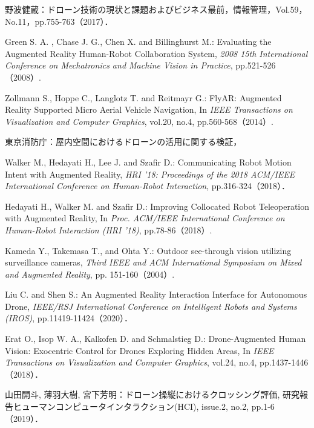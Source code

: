 \documentclass[submit,techrep]{ipsj}
\begin{document}
\begin{thebibliography}{10}

野波健蔵：ドローン技術の現状と課題およびビジネス最前，情報管理，Vol.59，No.11，pp.755-763（2017）．


Green S. A. , Chase J. G., Chen X. and Billinghurst M.: Evaluating the Augmented Reality Human-Robot Collaboration System, 
{\it 2008 15th International Conference on Mechatronics and Machine Vision in Practice}, 
pp.521-526（2008）.

Zollmann S., Hoppe C., Langlotz T. and Reitmayr G.:
FlyAR: Augmented Reality Supported Micro Aerial Vehicle Navigation, In 
{\it IEEE Transactions on Visualization and Computer Graphics}, 
vol.20, no.4, pp.560-568（2014）. 


東京消防庁：屋内空間におけるドローンの活用に関する検証，

Walker M., Hedayati H., Lee J. and Szafir D.: Communicating Robot Motion Intent with Augmented Reality, 
{\it HRI '18: Proceedings of the 2018 ACM/IEEE International Conference on Human-Robot Interaction}, 
pp.316-324（2018）．

Hedayati H., Walker M. and Szafir D.: Improving Collocated Robot Teleoperation with Augmented Reality, In 
{\it Proc. ACM/IEEE International Conference on Human-Robot Interaction (HRI '18)}, 
pp.78-86（2018）.

Kameda Y., Takemasa T., and Ohta Y.: Outdoor see-through vision utilizing surveillance cameras, 
{\it Third IEEE and ACM International Symposium on Mixed and Augmented Reality}, 
pp.
151-160（2004）.

Liu C. and Shen S.: An Augmented Reality Interaction Interface for Autonomous Drone, 
{\it IEEE/RSJ International Conference on Intelligent Robots and Systems (IROS)}, 
pp.11419-11424（2020）．

Erat O., Isop W. A., Kalkofen D. and Schmalstieg D.: Drone-Augmented Human Vision: Exocentric Control for Drones Exploring Hidden Areas, In 
{\it IEEE Transactions on Visualization and Computer Graphics}, 
vol.24, no.4, pp.1437-1446（2018）．

山田開斗, 薄羽大樹, 宮下芳明：ドローン操縦におけるクロッシング評価, 研究報告ヒューマンコンピュータインタラクション(HCI), issue.2, no.2, pp.1-6（2019）．

\end{thebibliography}
\end{document}
